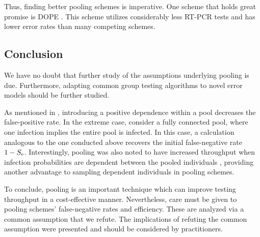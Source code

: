 \documentclass{article}
\begin{document}
Thus, finding better pooling schemes is imperative. One scheme that
holds great promise is DOPE \cite{DOPE}. This scheme utilizes
considerably less RT-PCR tests and has lower error rates than many
competing schemes.

\subsection{Conclusion}
We have no doubt that further study of the assumptions underlying
pooling is due. Furthermore, adapting common group testing algorithms
\cite{Kim} to novel error models should be further studied.





As mentioned in \cite{DorfmanYuvalDor}, introducing a positive
dependence within a pool decreases the false-positive rate. In the
extreme case, consider a fully connected pool, where one infection
implies the entire pool is infected. In this case, a calculation
analogous to the one conducted above recovers the initial
false-negative rate $1-S_\text{e}$. Interestingly, pooling was also noted to
have increased throughput when infection probabilities are dependent
between the pooled individuals \cite{DorfmanYuvalDor}, providing
another advantage to sampling dependent individuals in pooling
schemes.


To conclude, pooling is an important technique which can improve
testing throughput in a cost-effective manner. Nevertheless, care must
be given to pooling schemes' false-negative rates and
efficiency. These are analyzed via a common assumption that we refute.
The implications of refuting the common assumption were presented and
should be considered by practitioners.


%


\end{document}
